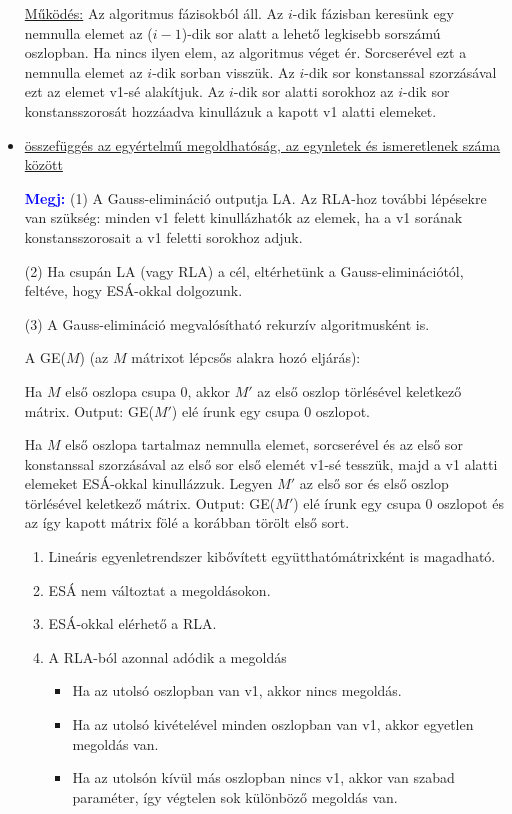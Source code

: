 \documentclass[../../szobeli.tex]{subfiles}
\begin{document}
\begin{itemize}
            \underline{Működés:} Az algoritmus fázisokból áll. Az $i$-dik fázisban keresünk egy nemnulla elemet az ($i-1$)-dik sor alatt a lehető legkisebb sorszámú oszlopban. Ha nincs ilyen elem, az algoritmus véget ér. Sorcserével ezt a nemnulla elemet az $i$-dik sorban visszük. Az $i$-dik sor konstanssal szorzásával ezt az elemet v1-sé alakítjuk. Az $i$-dik sor alatti sorokhoz az $i$-dik sor konstansszorosát hozzáadva kinullázuk a kapott v1 alatti elemeket.

        \item \underline{összefüggés az egyértelmű megoldhatóság, az egynletek és ismeretlenek száma között}
        
            \textcolor{blue}{\textbf{Megj:}} (1) A Gauss-elimináció outputja LA. Az RLA-hoz további lépésekre van szükség: minden v1 felett kinullázhatók az elemek, ha a v1 sorának konstansszorosait a v1 feletti sorokhoz adjuk. 

            (2) Ha csupán LA (vagy RLA) a cél, eltérhetünk a Gauss-eliminációtól, feltéve, hogy ESÁ-okkal dolgozunk.

            (3) A Gauss-elimináció megvalósítható rekurzív algoritmusként is. 

            A GE($M$) (az $M$ mátrixot lépcsős alakra hozó eljárás):

             Ha $M$ első oszlopa csupa 0, akkor $M'$ az első oszlop törlésével keletkező mátrix. Output: GE($M'$) elé írunk egy csupa 0 oszlopot.

             Ha $M$ első oszlopa tartalmaz nemnulla elemet, sorcserével és az első sor konstanssal szorzásával az első sor első elemét v1-sé tesszük, majd a v1 alatti elemeket ESÁ-okkal kinullázzuk. Legyen $M'$ az első sor és első oszlop törlésével keletkező mátrix. Output: GE($M'$) elé írunk egy csupa 0 oszlopot és az így kapott mátrix fölé a korábban törölt első sort.

            \begin{enumerate}
                \item Lineáris egyenletrendszer kibővített együtthatómátrixként is magadható.
                \item ESÁ nem változtat a megoldásokon.
                \item ESÁ-okkal elérhető a RLA.
                \item A RLA-ból azonnal adódik a megoldás \begin{itemize}
                    \item Ha az utolsó oszlopban van v1, akkor nincs megoldás.
                    \item Ha az utolsó kivételével minden oszlopban van v1, akkor egyetlen megoldás van.
                    \item Ha az utolsón kívül más oszlopban nincs v1, akkor van szabad paraméter, így végtelen sok különböző megoldás van.
                \end{itemize}
            \end{enumerate}


\end{itemize}
\end{document}
